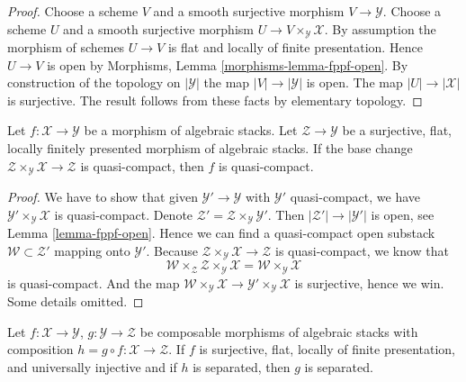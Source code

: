\begin{proof}
Choose a scheme $V$ and a smooth surjective morphism $V \to \mathcal{Y}$.
Choose a scheme $U$ and a smooth surjective morphism
$U \to V \times_\mathcal{Y} \mathcal{X}$. By assumption the morphism
of schemes $U \to V$ is flat and locally of finite presentation.
Hence $U \to V$ is open by
Morphisms, Lemma \ref{morphisms-lemma-fppf-open}.
By construction of the topology on $|\mathcal{Y}|$ the map
$|V| \to |\mathcal{Y}|$ is open.
The map $|U| \to |\mathcal{X}|$ is surjective.
The result follows from these facts by elementary topology.
\end{proof}

\begin{lemma}
\label{lemma-descent-quasi-compact}
Let $f : \mathcal{X} \to \mathcal{Y}$ be a morphism of algebraic stacks.
Let $\mathcal{Z} \to \mathcal{Y}$ be a surjective, flat, locally finitely
presented morphism of algebraic stacks. If the base change
$\mathcal{Z} \times_\mathcal{Y} \mathcal{X} \to \mathcal{Z}$
is quasi-compact, then $f$ is quasi-compact.
\end{lemma}

\begin{proof}
We have to show that given $\mathcal{Y}' \to \mathcal{Y}$
with $\mathcal{Y}'$ quasi-compact, we have
$\mathcal{Y}' \times_\mathcal{Y} \mathcal{X}$ is quasi-compact.
Denote $\mathcal{Z}' = \mathcal{Z} \times_\mathcal{Y} \mathcal{Y}'$.
Then $|\mathcal{Z}'| \to |\mathcal{Y}'|$ is open, see
Lemma \ref{lemma-fppf-open}. Hence we can find a quasi-compact
open substack $\mathcal{W} \subset \mathcal{Z}'$ mapping onto
$\mathcal{Y}'$. Because
$\mathcal{Z} \times_\mathcal{Y} \mathcal{X} \to \mathcal{Z}$
is quasi-compact, we know that
$$
\mathcal{W} \times_\mathcal{Z} \mathcal{Z} \times_\mathcal{Y} \mathcal{X} =
\mathcal{W} \times_\mathcal{Y} \mathcal{X}
$$
is quasi-compact. And the map
$\mathcal{W} \times_\mathcal{Y} \mathcal{X} \to
\mathcal{Y}' \times_\mathcal{Y} \mathcal{X}$
is surjective, hence we win. Some details omitted.
\end{proof}

\begin{lemma}
\label{lemma-check-separated-on-ui-cover}
Let $f : \mathcal{X} \to \mathcal{Y}$, $g : \mathcal{Y} \to \mathcal{Z}$
be composable morphisms of algebraic stacks with composition
$h = g \circ f : \mathcal{X} \to \mathcal{Z}$.
If $f$ is surjective, flat, locally of finite presentation,
and universally injective and if $h$ is separated, then
$g$ is separated.
\end{lemma}

